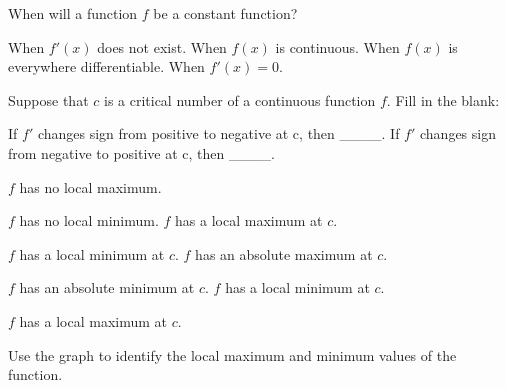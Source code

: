 \documentclass[addpoints, 12pt]{exam}%
\newcommand{\spc}{\vspace*{0.5cm}}
\begin{document}
\begin{questions}
When will a function $f$ be a constant function?

\begin{choices}
\choice When $f'(x)$ does not exist. 
\choice When $f(x)$ is continuous.
\choice When $f(x)$ is everywhere differentiable.
\CorrectChoice When $f'(x) = 0$.
\end{choices}

\spc

\question[1]

Suppose that $c$ is a critical number of a continuous function $f$.
Fill in the blank: 

If $f'$ changes sign from positive to negative at c, then ____. 
\newline If $f'$ changes sign from negative to positive at c, then ____.

\begin{multicols}{2}
\begin{choices}
\choice $f$ has no local maximum.

$f$ has no local minimum.
\CorrectChoice $f$ has a local maximum at $c$.

$f$ has a local minimum at $c$.
\choice $f$ has an absolute maximum at $c$.

$f$ has an absolute minimum at $c$.
\choice $f$ has a local minimum at $c$.

$f$ has a local maximum at $c$.

\end{choices}
\end{multicols}



\question[1]

Use the graph to identify the local maximum and minimum values of the function.\vspace*{10pt} 


\end{questions}
\end{document}

